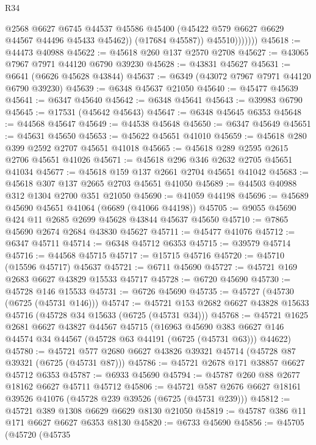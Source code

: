 \begin{lexlean}{R34}
\begin{coremodule}
                      @2568
                      @6627
                      @6745
                      @44537
                      @45586
                      @45400
                      (@45422 @579 @6627 @6629 @44567 @44496 @45433 @45462))
                    (@17684 @45587))
                  @45510)))))))
@45618 := @44473 @40988
@45622 := @45618 @260 @137 @2570 @2708
@45627 := @43065 @7967 @7971 @44120 @6790 @39230
@45628 := @43831 @45627
@45631 := @6641 (@6626 @45628 @43844)
@45637 := @6349 (@43072 @7967 @7971 @44120 @6790 @39230)
@45639 := @6348 @45637 @21050
@45640 := @45477 @45639
@45641 := @6347 @45640
@45642 := @6348 @45641
@45643 := @39983 @6790
@45645 := @17531 (@45642 @45643)
@45647 := @6348 @45645 @6353
@45648 := @44568 @45647
@45649 := @44538 @45648
@45650 := @6347 @45649
@45651 := @45631 @45650
@45653 := @45622 @45651 @41010
@45659 := @45618 @280 @399 @2592 @2707 @45651 @41018
@45665 := @45618 @289 @2595 @2615 @2706 @45651 @41026
@45671 := @45618 @296 @346 @2632 @2705 @45651 @41034
@45677 := @45618 @159 @137 @2661 @2704 @45651 @41042
@45683 := @45618 @307 @137 @2665 @2703 @45651 @41050
@45689 := @44503 @40988 @312 @1304 @2700 @351 @21050
@45690 := @41059 @44198
@45696 := @45689 @45690 @45651 @41064 (@6689 (@41066 @44198))
@45705 := @9055 @45690 @424 @11 @2685 @2699 @45628 @43844 @45637 @45650
@45710 := @7865 @45690 @2674 @2684 @43830 @45627
@45711 := @45477 @41076
@45712 := @6347 @45711
@45714 := @6348 @45712 @6353
@45715 := @39579 @45714
@45716 := @44568 @45715
@45717 := @15715 @45716
@45720 := @45710 (@15596 @45717) @45637
@45721 := @6711 @45690
@45727 := @45721 @169 @2683 @6627 @43829 @15533 @45717
@45728 := @6720 @45690
@45730 := @45728 @146 @15533
@45731 := @6726 @45690
@45735 := @45727 (@45730 (@6725 (@45731 @146)))
@45747 := @45721 @153 @2682 @6627 @43828 @15633 @45716 (@45728 @34 @15633 (@6725 (@45731 @34)))
@45768 := @45721
    @1625
    @2681
    @6627
    @43827
    @44567
    @45715
    (@16963
      @45690
      @383
      @6627
      @146
      @44574
      @34
      @44567
      (@45728 @63 @44191 (@6725 (@45731 @63)))
      @44622)
@45780 := @45721 @577 @2680 @6627 @43826 @39321 @45714 (@45728 @87 @39321 (@6725 (@45731 @87)))
@45786 := @45721 @2678 @171 @38857 @6627 @45712 @6353
@45787 := @6933 @45690
@45794 := @45787 @260 @88 @2677 @18162 @6627 @45711 @45712
@45806 := @45721 @587 @2676 @6627 @18161 @39526 @41076 (@45728 @239 @39526 (@6725 (@45731 @239)))
@45812 := @45721 @389 @1308 @6629 @6629 @8130 @21050
@45819 := @45787 @386 @11 @171 @6627 @6627 @6353 @8130
@45820 := @6733 @45690
@45856 := @45705
    (@45720
      (@45735

\end{coremodule}
\end{lexlean}
